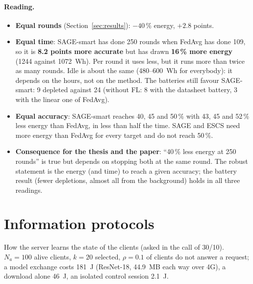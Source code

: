 \documentclass[11pt,a4paper]{article}
\begin{document}
\paragraph{Reading.}
\begin{itemize}
  \item \textbf{Equal rounds} (Section~\ref{sec:results}): $-40\,\%$ energy,
        $+2.8$ points.
  \item \textbf{Equal time}: SAGE-smart has done 250 rounds when FedAvg has done
        109, so it is \textbf{8.2 points more accurate} but has drawn
        \textbf{16\,\% more energy} (1244 against 1072~Wh). Per round it uses
        less, but it runs more than twice as many rounds. Idle is about the same
        (480--600~Wh for everybody): it depends on the hours, not on the method.
        The batteries still favour SAGE-smart: 9 depleted against 24 (without
        FL: 8 with the datasheet battery, 3 with the linear one of FedAvg).
  \item \textbf{Equal accuracy}: SAGE-smart reaches 40, 45 and 50\,\% with
        43, 45 and 52\,\% less energy than FedAvg, in less than half the time.
        SAGE and ESCS need more energy than FedAvg for every target and do not
        reach 50\,\%.
  \item \textbf{Consequence for the thesis and the paper}: ``40\,\% less energy
        at 250 rounds'' is true but depends on stopping both at the same round.
        The robust statement is the energy (and time) to reach a given accuracy;
        the battery result (fewer depletions, almost all from the background)
        holds in all three readings.
\end{itemize}

\section{Information protocols}
\label{sec:protocols}

How the server learns the state of the clients (asked in the call of 30/10).
$N_a=100$ alive clients, $k=20$ selected, $\rho=0.1$ of clients do not answer
a request; a model exchange costs 181~J (ResNet-18, 44.9~MB each way over 4G), a
download alone 46~J, an isolated control session 2.1~J.
\end{document}
